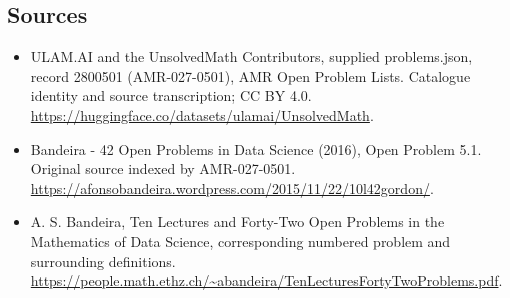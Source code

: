 \documentclass[11pt,a4paper]{article}
\begin{document}
\subsection{Sources}
\begin{itemize}
\item[S1] ULAM.AI and the UnsolvedMath Contributors, supplied problems.json, record 2800501 (AMR-027-0501), AMR Open Problem Lists. Catalogue identity and source transcription; CC BY 4.0.
\url{https://huggingface.co/datasets/ulamai/UnsolvedMath}.
\item[S2] Bandeira - 42 Open Problems in Data Science (2016), Open Problem 5.1. Original source indexed by AMR-027-0501.
\url{https://afonsobandeira.wordpress.com/2015/11/22/10l42gordon/}.
\item[S3] A. S. Bandeira, Ten Lectures and Forty-Two Open Problems in the Mathematics of Data Science, corresponding numbered problem and surrounding definitions.
\url{https://people.math.ethz.ch/~abandeira/TenLecturesFortyTwoProblems.pdf}.
\end{itemize}
\end{document}
